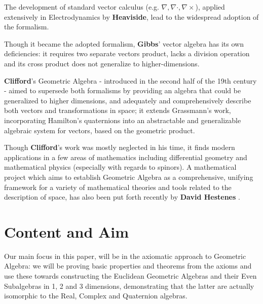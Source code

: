 The development of standard vector calculus (e.g. $\nabla, \nabla \cdot, \nabla \times$), applied extensively in Electrodynamics by \textbf{Heaviside}, lead to the widespread adoption of the formalism.

Though it became the adopted formalism, \textbf{Gibbs}' vector algebra has its own deficiencies: it requires two separate vectors product, lacks a division operation and its cross product does not generalize to higher-dimensions.

\textbf{Clifford}'s  Geometric Algebra - introduced in the second half of the 19th century - aimed to supersede both formalisms by providing an algebra that could be generalized to higher dimensions, and adequately and comprehensively describe both vectors and transformations in space; it extends Grassmann's work, incorporating Hamilton's quaternions into an abstractable and generalizable algebraic system for vectors, based on the geometric product.

Though \textbf{Clifford}'s work was mostly neglected in his time, it finds modern applications in a few areas of mathematics including differential geometry and mathematical physics (especially with regards to spinors). A mathematical project which aims to establish Geometric Algebra as a comprehensive, unifying framework for a variety of mathematical theories and tools related to the description of space, has also been put forth recently by \textbf{David Hestenes} \cite{ga-origin}.%


\section{Content and Aim}

Our main focus in this paper, will be in the axiomatic approach to Geometric Algebra: we will be proving basic properties and theorems from the axioms and use these towards constructing the Euclidean Geometric Algebras and their Even Subalgebras in 1, 2 and 3 dimensions, demonstrating that the latter are actually isomorphic to the Real, Complex and Quaternion algebras.

